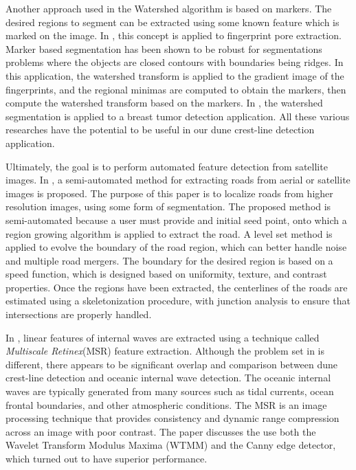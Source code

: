 Another approach used in the Watershed algorithm is based on markers. The desired regions to segment can be extracted using some known feature which is marked on the image. In \cite{Fingerprint-pore-extraction-based-marker-controlled-watershed-segmentation}, this concept is applied to fingerprint pore extraction. Marker based segmentation has been shown to be robust for segmentations problems where the objects are closed contours with boundaries being ridges. In this application, the watershed transform is applied to the gradient image of the fingerprints, and the regional minimas are computed to obtain the markers, then compute the watershed transform based on the markers. In \cite{Detection-breast-tumor-candidates-using-marker-controlled-watershed-segmentation}, the watershed segmentation is applied to a breast tumor detection application. All these various researches have the potential to be useful in our dune crest-line detection application. 

Ultimately, the goal is to perform automated feature detection from satellite images. In \cite{Extraction_roads_multispectral_imagery}, a semi-automated method for extracting roads from aerial or satellite images is proposed. The purpose of this paper is to localize roads from higher resolution images, using some form of segmentation. The proposed method is semi-automated because a user must provide and initial seed point, onto which a region growing algorithm is applied to extract the road. A level set method is applied to evolve the boundary of the road region, which can better handle noise and multiple road mergers. The boundary for the desired region is based on a speed function, which is designed based on uniformity, texture, and contrast properties. Once the regions have been extracted, the centerlines of the roads are estimated using a skeletonization procedure, with junction analysis to ensure that intersections are properly handled.

In \cite{Extracting_ocean_surface_feature_modis}, linear features of internal waves are extracted using a technique called \emph{Multiscale Retinex}(MSR) feature extraction. Although the problem set in \cite{Extracting_ocean_surface_feature_modis} is different, there appears to be significant overlap and comparison between dune crest-line detection and oceanic internal wave detection. The oceanic internal waves are typically generated from many sources such as tidal currents, ocean frontal boundaries, and other atmospheric conditions. The MSR is an image processing technique that provides consistency and dynamic range compression across an image with poor contrast. The paper discusses the use both the Wavelet Transform Modulus Maxima (WTMM) and the Canny edge detector, which turned out to have superior performance.

